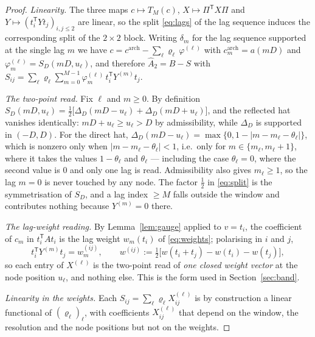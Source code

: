 \documentclass[11pt,a4paper]{article}
\theoremstyle{plain}
\theoremstyle{definition}
\newcommand{\T}{\mathsf{T}}
\newcommand{\Tm}[1]{T_{#1}}
\newcommand{\Ah}{\widehat{A}}
\begin{document}
\begin{proof}
\emph{Linearity.} The three maps $c\mapsto\Tm{M}(c)$,
$X\mapsto\Pi^{\T}X\Pi$ and $Y\mapsto(t_i^{\T}Yt_j)_{i,j\le2}$ are linear, so
the split \eqref{eq:lags} of the lag sequence induces the corresponding split of
the $2\times2$ block. Writing $\delta_m$ for the lag sequence supported at the
single lag $m$ we have $c=c^{\mathrm{arch}}
-\sum_\ell\varrho_\ell\,\varphi^{(\ell)}$ with $c^{\mathrm{arch}}_m=a(mD)$ and
$\varphi^{(\ell)}_m=S_D(mD,u_\ell)$, and therefore $\Ah_2=B-S$ with
$S_{ij}=\sum_\ell\varrho_\ell\sum_{m=0}^{M-1}\varphi^{(\ell)}_m\,
t_i^{\T}Y^{(m)}t_j$.

\emph{The two-point read.} Fix $\ell$ and $m\ge0$. By definition
$S_D(mD,u_\ell)=\tfrac12\bigl[\Delta_D(mD-u_\ell)+\Delta_D(mD+u_\ell)\bigr]$,
and the reflected hat vanishes identically: $mD+u_\ell\ge u_\ell>D$ by
admissibility, while $\Delta_D$ is supported in $(-D,D)$. For the direct hat,
$\Delta_D(mD-u_\ell)=\max\{0,1-|m-m_\ell-\theta_\ell|\}$, which is nonzero only
when $|m-m_\ell-\theta_\ell|<1$, i.e.\ only for $m\in\{m_\ell,m_\ell+1\}$, where
it takes the values $1-\theta_\ell$ and $\theta_\ell$ --- including the case
$\theta_\ell=0$, where the second value is $0$ and only one lag is read.
Admissibility also gives $m_\ell\ge1$, so the lag $m=0$ is never touched by any
node. The factor $\tfrac12$ in \eqref{eq:split} is the symmetrisation of
$S_D$, and a lag index $\ge M$ falls outside the window and contributes nothing
because $Y^{(m)}=0$ there.

\emph{The lag-weight reading.} By Lemma~\ref{lem:gauge} applied to $v=t_i$, the
coefficient of $c_m$ in $t_i^{\T}At_i$ is the lag weight $w_m(t_i)$ of
\eqref{eq:weights}; polarising in $i$ and $j$,
\begin{equation}
\label{eq:Yread}
  t_i^{\T}Y^{(m)}t_j=w^{(ij)}_m,
  \qquad
  w^{(ij)}:=\tfrac12\bigl[w(t_i+t_j)-w(t_i)-w(t_j)\bigr],
\end{equation}
so each entry of $X^{(\ell)}$ is the two-point read of \emph{one closed weight
vector} at the node position $u_\ell$, and nothing else. This is the form used
in Section~\ref{sec:band}.

\emph{Linearity in the weights.} Each $S_{ij}=\sum_\ell\varrho_\ell
X^{(\ell)}_{ij}$ is by construction a linear functional of
$(\varrho_\ell)_\ell$, with coefficients $X^{(\ell)}_{ij}$ that depend on the
window, the resolution and the node positions but not on the weights.
\end{proof}
\end{document}
